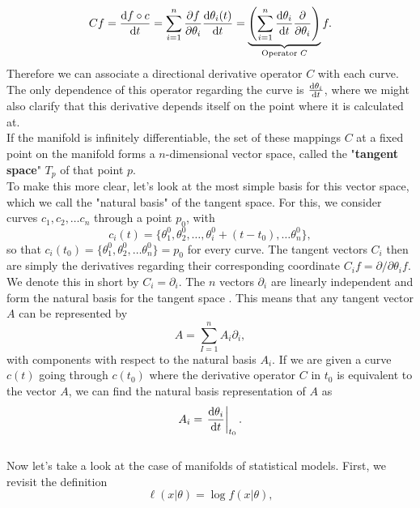 \begin{equation}
	Cf = \frac{\mathrm{d}f\circ c}{\mathrm{d}t} = \sum_{i=1}^{n} \frac{\partial f}{\partial\theta_i}\frac{\mathrm{d}\theta_i(t)}{\mathrm{d}t} = \underbrace{\left(\sum_{i=1}^{n}\frac{\mathrm{d}\theta_i}{\mathrm{d}t}\frac{\partial}{\partial\theta_i}\right)}_{\text{Operator }C} f.
\end{equation}
Therefore we can associate a directional derivative operator $C$ with each curve. The only dependence of this operator regarding the curve is $\frac{\mathrm{d}\theta_i}{\mathrm{d}t}$, where we might also clarify that this derivative depends itself on the point where it is calculated at.\\
If the manifold is infinitely differentiable, the set of these mappings $C$ at a fixed point on the manifold forms a $n$-dimensional vector space, called the "\textbf{tangent space}" $T_p$ of that point $p$. \\
To make this more clear, let's look at the most simple basis for this vector space, which we call the "natural basis" of the tangent space. For this, we consider curves $c_1,c_2, \dotsc c_n$ through a point $p_0$, with
\begin{equation}
	c_i(t) = \{\theta_1^0,\theta_2^0, \dotsc, \theta_i^0 + (t-t_0), \dotsc \theta_n^0 \},
\end{equation}
so that $c_i(t_0) = \{\theta_1^0,\theta_2^0, \dotsc\theta_n^0\} = p_0$ for every curve. The tangent vectors $C_i$ then are simply the derivatives regarding their corresponding coordinate $C_i f = \partial/\partial \theta_i f$. We denote this in short by $C_i = \partial_i$. The $n$ vectors $\partial_i$ are linearly independent and form the natural basis for the tangent space \cite{AmarisLectureNotes} . This means that any tangent vector $A$ can be represented by \cite{AmarisLectureNotes} 
\begin{equation}
	A = \sum_{I=1}^{n} A_i \partial_i,
\end{equation}
with components with respect to the natural basis $A_i$. If we are given a curve $c(t)$ going through $c(t_0)$ where the derivative operator $C$ in $t_0$ is equivalent to the vector $A$, we can find the natural basis representation of $A$ as \cite{AmarisLectureNotes}
\begin{equation}
	A_i = \left. \frac{\mathrm{d}\theta_i}{\mathrm{d}t}\right|_{t_0}.
\end{equation} \\
Now let's take a look at the case of manifolds of statistical models. First, we revisit the definition
\begin{equation}
	\ell(x|\theta) = \log f(x|\theta),
\end{equation}
